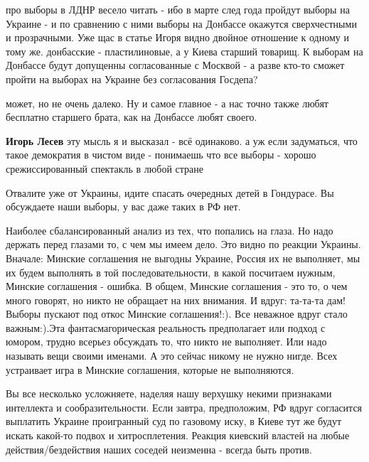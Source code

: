 \begin{itemize}

про выборы в ЛДНР весело читать - ибо в марте след года пройдут выборы на
Украине - и по сравнению с ними выборы на Донбассе окажутся сверхчестными и
прозрачными. Уже щас в статье Игоря видно двойное отношение к одному и тому же.
донбасские - пластилиновые, а у Киева старший товарищ. К выборам на Донбассе
будут допущенны согласованные с Москвой - а разве кто-то сможет пройти на
выборах на Украине без согласования Госдепа?

\begin{itemize} %
может, но не очень далеко. Ну и самое главное - а нас точно также любят бесплатно старшего брата, как на Донбассе любят своего.

\textbf{Игорь Лесев} эту мысль я и высказал - всё одинаково. а уж если задуматься, что такое демократия в чистом виде - понимаешь что все выборы - хорошо срежиссированный спектакль в любой стране

Отвалите уже от Украины, идите спасать очередных детей в Гондурасе. Вы обсуждаете наши выборы, у вас даже таких в РФ нет.
\end{itemize} %


Наиболее сбалансированный анализ из тех, что попались на глаза. Но надо держать
перед глазами то, с чем мы имеем дело. Это видно по реакции Украины. Вначале:
Минские соглашения не выгодны Украине, Россия их не выполняет, мы их будем
выполнять в той последовательности, в какой посчитаем нужным, Минские
соглашения - ошибка. В общем, Минские соглашения - это то, о чем много говорят,
но никто не обращает на них внимания. И вдруг: та-та-та дам! Выборы пускают под
откос Минские соглашения!:). Все неважное вдруг стало важным:).Эта
фантасмагорическая реальность предполагает или подход с юмором, трудно всерьез
обсуждать то, что никто не выполняет. Или надо называть вещи своими именами. А
это сейчас никому не нужно нигде. Всех устраивает игра в Минские соглашения,
которые не выполняются.

\begin{itemize} %

Вы все несколько усложняете, наделяя нашу верхушку некими признаками интеллекта
и сообразительности. Если завтра, предположим, РФ вдруг согласится выплатить
Украине проигранный суд по газовому иску, в Киеве тут же будут искать какой-то
подвох и хитросплетения. Реакция киевский властей на любые действия/бездействия
наших соседей неизменна - всегда быть против.


\end{itemize}
\end{itemize}
